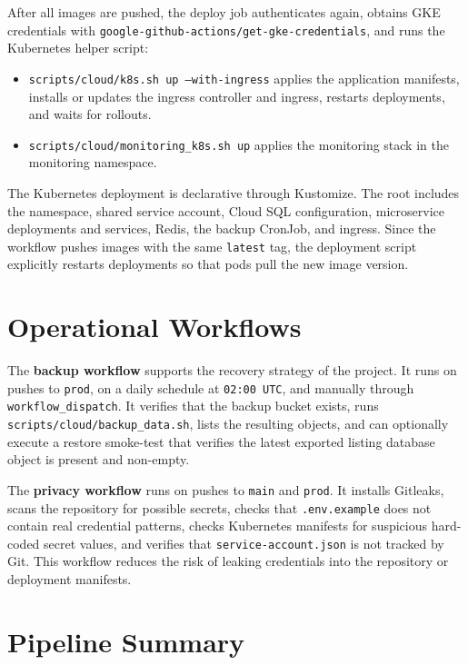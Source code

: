 After all images are pushed, the deploy job authenticates again, obtains GKE credentials with \texttt{google-github-actions/get-gke-credentials}, and runs the Kubernetes helper script:

\begin{itemize}
    \item \texttt{scripts/cloud/k8s.sh up --with-ingress} applies the application manifests, installs or updates the ingress controller and ingress, restarts deployments, and waits for rollouts.
    \item \texttt{scripts/cloud/monitoring\_k8s.sh up} applies the monitoring stack in the monitoring namespace.
\end{itemize}

The Kubernetes deployment is declarative through Kustomize. The root  includes the namespace, shared service account, Cloud SQL configuration, microservice deployments and services, Redis, the backup CronJob, and ingress. Since the workflow pushes images with the same \texttt{latest} tag, the deployment script explicitly restarts deployments so that pods pull the new image version.

\section{Operational Workflows}

The \textbf{backup workflow} supports the recovery strategy of the project. It runs on pushes to \texttt{prod}, on a daily schedule at \texttt{02:00 UTC}, and manually through \texttt{workflow\_dispatch}. It verifies that the backup bucket exists, runs \texttt{scripts/cloud/backup\_data.sh}, lists the resulting objects, and can optionally execute a restore smoke-test that verifies the latest exported listing database object is present and non-empty.

The \textbf{privacy workflow} runs on pushes to \texttt{main} and \texttt{prod}. It installs Gitleaks, scans the repository for possible secrets, checks that \texttt{.env.example} does not contain real credential patterns, checks Kubernetes manifests for suspicious hard-coded secret values, and verifies that \texttt{service-account.json} is not tracked by Git. This workflow reduces the risk of leaking credentials into the repository or deployment manifests.

\section{Pipeline Summary}

